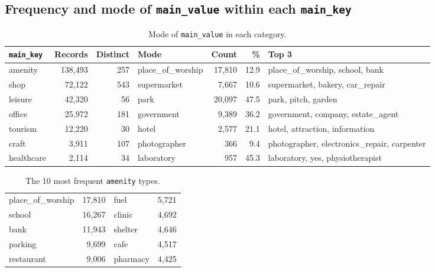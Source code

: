 \documentclass[11pt,a4paper]{article}
\newcommand{\col}[1]{\texttt{#1}}
\begin{document}
\subsection{Frequency and mode of \col{main\_value} within each \col{main\_key}}

\begin{table}[H]
\centering\footnotesize
\setlength{\tabcolsep}{3.5pt}
\caption{Mode of \col{main\_value} in each category.}
\begin{tabular}{lrrlrrl}
\toprule
\col{main\_key} & \textbf{Records} & \textbf{Distinct} & \textbf{Mode} & \textbf{Count} & \textbf{\%} & \textbf{Top 3} \\
\midrule
amenity    & 138{,}493 & 257 & place\_of\_worship & 17{,}810 & 12.9 & place\_of\_worship, school, bank \\
shop       & 72{,}122  & 543 & supermarket        & 7{,}667  & 10.6 & supermarket, bakery, car\_repair \\
leisure    & 42{,}320  & 56  & park               & 20{,}097 & 47.5 & park, pitch, garden \\
office     & 25{,}972  & 181 & government         & 9{,}389  & 36.2 & government, company, estate\_agent \\
tourism    & 12{,}220  & 30  & hotel              & 2{,}577  & 21.1 & hotel, attraction, information \\
craft      & 3{,}911   & 107 & photographer       & 366      & 9.4  & photographer, electronics\_repair, carpenter \\
healthcare & 2{,}114   & 34  & laboratory         & 957      & 45.3 & laboratory, yes, physiotherapist \\
\bottomrule
\end{tabular}
\end{table}

\begin{table}[H]
\centering
\caption{The 10 most frequent \col{amenity} types.}
\begin{tabular}{lr@{\hspace{1.2cm}}lr}
\toprule
place\_of\_worship & 17{,}810 & fuel     & 5{,}721 \\
school             & 16{,}267 & clinic   & 4{,}692 \\
bank               & 11{,}943 & shelter  & 4{,}646 \\
parking            & 9{,}699  & cafe     & 4{,}517 \\
restaurant         & 9{,}006  & pharmacy & 4{,}425 \\
\bottomrule
\end{tabular}
\end{table}
\end{document}
